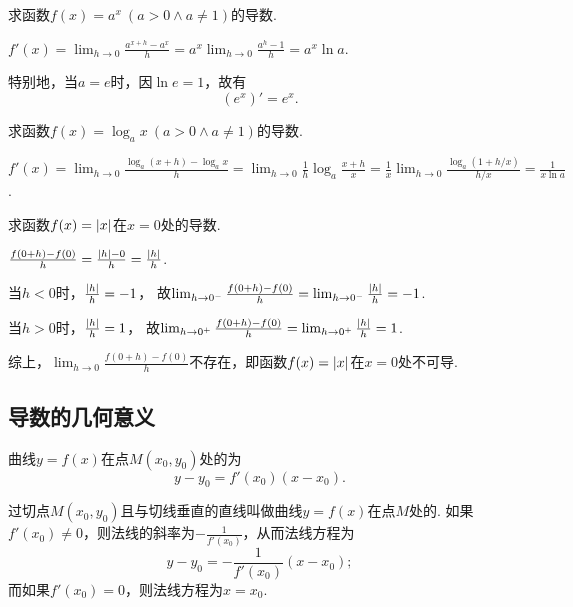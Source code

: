\begin{example}
求函数\(f(x) = a^x\ (a > 0 \land a \neq 1)\)的导数.
\begin{solution}
\(f'(x)
= \lim_{h\to0}\frac{a^{x+h}-a^x}{h}
= a^x \lim_{h\to0}\frac{a^h-1}{h}
= a^x \ln a\).
\end{solution}

特别地，当\(a=e\)时，因\(\ln e = 1\)，故有\[
	(e^x)' = e^x.
\]
\end{example}

\begin{example}
求函数\(f(x) = \log_a x\ (a > 0 \land a \neq 1)\)的导数.
\begin{solution}
\(f'(x)
= \lim_{h\to0}\frac{\log_a(x+h)-\log_a x}{h}
= \lim_{h\to0}{\frac{1}{h} \log_a\frac{x+h}{x}}
= \frac{1}{x} \lim_{h\to0}\frac{\log_a(1+h/x)}{h/x}
= \frac{1}{x \ln a}\).
\end{solution}
\end{example}

\begin{example}
求函数\(f(x) = \abs{x}\)在\(x=0\)处的导数.
\begin{solution}
\(\frac{f(0+h)-f(0)}{h} = \frac{\abs{h}-0}{h} = \frac{\abs{h}}{h}\).

当\(h < 0\)时，\(\frac{\abs{h}}{h} = -1\)，
故\(\lim_{h\to0^-}\frac{f(0+h)-f(0)}{h}
= \lim_{h\to0^-}\frac{\abs{h}}{h} = -1\).

当\(h > 0\)时，\(\frac{\abs{h}}{h} = 1\)，
故\(\lim_{h\to0^+}\frac{f(0+h)-f(0)}{h}
= \lim_{h\to0^+}\frac{\abs{h}}{h} = 1\).

综上，\(\lim_{h\to0}\frac{f(0+h)-f(0)}{h}\)不存在，即函数\(f(x) = \abs{x}\)在\(x = 0\)处不可导.
\end{solution}
\end{example}

\subsection{导数的几何意义}
\begin{theorem}
曲线\(y=f(x)\)在点\(M(x_0,y_0)\)处的为\[
	y-y_0=f'(x_0)(x-x_0).
\]

过切点\(M(x_0,y_0)\)且与切线垂直的直线叫做曲线\(y=f(x)\)在点\(M\)处的.
如果\(f'(x_0) \neq 0\)，则法线的斜率为\(-\frac{1}{f'(x_0)}\)，从而法线方程为\[
	y-y_0=-\frac{1}{f'(x_0)}(x-x_0);
\]
而如果\(f'(x_0) = 0\)，则法线方程为\(x = x_0\).
\end{theorem}

